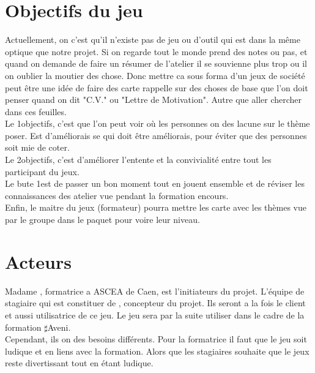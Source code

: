 \newpage

\section{Objectifs du jeu}

Actuellement, on c'est qu'il n'existe pas de jeu ou d'outil qui est dans la même optique que notre projet. Si on regarde tout le monde prend des notes ou pas, et quand on demande de faire un résumer de l'atelier il se souvienne plus trop ou il on oublier la moutier des chose. Donc mettre ca sous forma d'un jeux de société peut être une idée de faire des carte rappelle sur des choses de base que l'on doit penser quand on dit "C.V." ou "Lettre de Motivation". Autre que aller chercher dans ces feuilles.\\

Le 1\ier objectifs, c'est que l'on peut voir où les personnes on des lacune sur le thème poser. Est d'améliorais se qui doit être améliorais, pour éviter que des personnes soit mie de coter.\\

Le 2\ieme objectifs, c’est d’améliorer l’entente et la convivialité entre tout les participant du jeux.\\

Le bute 1\ier est de passer un bon moment tout en jouent ensemble et de réviser les connaissances des atelier vue pendant la formation encours. \\

Enfin, le maitre du jeux (formateur) pourra mettre les carte avec les thèmes vue par le groupe dans le paquet pour voire leur niveau.

\section{Acteurs}

Madame \formatise, formatrice a ASCEA de Caen, est l'initiateurs du projet. L'équipe de stagiaire qui est constituer de \stagiaire, concepteur du projet. Ils seront a la fois le client et aussi utilisatrice de ce jeu. Le jeu sera par la suite utiliser dans le cadre de la formation $\sharp$Aveni.\\

Cependant, ils on des besoins différents. Pour la formatrice il faut que le jeu soit ludique et en liens avec la formation. Alors que les stagiaires souhaite que le jeux reste divertissant tout en étant ludique.\\

